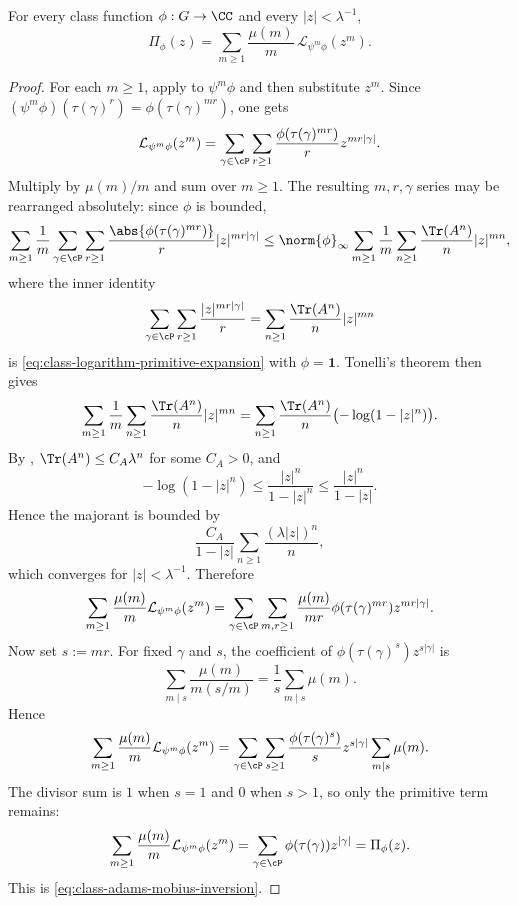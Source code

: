 \begin{corollary}
  \label{cor:class-function-adams-mobius}
  For every class function \(\phi:G\to\CC\) and every \(|z|<\lambda^{-1}\),
  \begin{equation}\label{eq:class-adams-mobius-inversion}
    \Pi_\phi(z)
    =
    \sum_{m\ge 1}\frac{\mu(m)}{m}\,
      \mathcal L_{\psi^m\phi}(z^m).
  \end{equation}
\end{corollary}

\begin{proof}
  For each \(m\ge 1\), apply
   to \(\psi^m\phi\) and
  then substitute \(z^m\). Since
  \((\psi^m\phi)(\tau(\gamma)^r)=\phi(\tau(\gamma)^{mr})\), one gets
  \[
    \mathcal L_{\psi^m\phi}(z^m)
    =
    \sum_{\gamma\in\cP}\sum_{r\ge 1}
      \frac{\phi(\tau(\gamma)^{mr})}{r}z^{mr|\gamma|}.
  \]
  Multiply by \(\mu(m)/m\) and sum over \(m\ge 1\). The resulting
  \(m,r,\gamma\) series may be rearranged absolutely: since \(\phi\) is
  bounded,
  \[
    \sum_{m\ge 1}\frac{1}{m}
      \sum_{\gamma\in\cP}\sum_{r\ge 1}
        \frac{\abs{\phi(\tau(\gamma)^{mr})}}{r}|z|^{mr|\gamma|}
    \le
    \norm{\phi}_\infty
    \sum_{m\ge 1}\frac{1}{m}
      \sum_{n\ge 1}\frac{\Tr(A^n)}{n}|z|^{mn},
  \]
  where the inner identity
  \[
    \sum_{\gamma\in\cP}\sum_{r\ge 1}\frac{|z|^{mr|\gamma|}}{r}
    =
    \sum_{n\ge 1}\frac{\Tr(A^n)}{n}|z|^{mn}
  \]
  is \eqref{eq:class-logarithm-primitive-expansion} with
  \(\phi=\mathbf 1\). Tonelli's theorem then gives
  \[
    \sum_{m\ge 1}\frac{1}{m}
      \sum_{n\ge 1}\frac{\Tr(A^n)}{n}|z|^{mn}
    =
    \sum_{n\ge 1}\frac{\Tr(A^n)}{n}
      \bigl(-\log(1-|z|^n)\bigr).
  \]
  By ,
  \(\Tr(A^n)\le C_A\lambda^n\) for some \(C_A>0\), and
  \[
    -\log(1-|z|^n)\le \frac{|z|^n}{1-|z|^n}\le \frac{|z|^n}{1-|z|}.
  \]
  Hence the majorant is bounded by
  \[
    \frac{C_A}{1-|z|}
    \sum_{n\ge 1}\frac{(\lambda|z|)^n}{n},
  \]
  which converges for \(|z|<\lambda^{-1}\). Therefore
  \[
    \sum_{m\ge 1}\frac{\mu(m)}{m}\mathcal L_{\psi^m\phi}(z^m)
    =
    \sum_{\gamma\in\cP}\sum_{m,r\ge 1}
      \frac{\mu(m)}{mr}\phi(\tau(\gamma)^{mr})z^{mr|\gamma|}.
  \]
  Now set \(s:=mr\). For fixed \(\gamma\) and \(s\), the coefficient of
  \(\phi(\tau(\gamma)^s)z^{s|\gamma|}\) is
  \[
    \sum_{m\mid s}\frac{\mu(m)}{m(s/m)}
    =
    \frac{1}{s}\sum_{m\mid s}\mu(m).
  \]
  Hence
  \[
    \sum_{m\ge 1}\frac{\mu(m)}{m}\mathcal L_{\psi^m\phi}(z^m)
    =
    \sum_{\gamma\in\cP}\sum_{s\ge 1}
      \frac{\phi(\tau(\gamma)^s)}{s}z^{s|\gamma|}
      \sum_{m\mid s}\mu(m).
  \]
  The divisor sum is \(1\) when \(s=1\) and \(0\) when \(s>1\), so only
  the primitive term remains:
  \[
    \sum_{m\ge 1}\frac{\mu(m)}{m}\mathcal L_{\psi^m\phi}(z^m)
    =
    \sum_{\gamma\in\cP}\phi(\tau(\gamma))z^{|\gamma|}
    =
    \Pi_\phi(z).
  \]
  This is \eqref{eq:class-adams-mobius-inversion}.
\end{proof}

